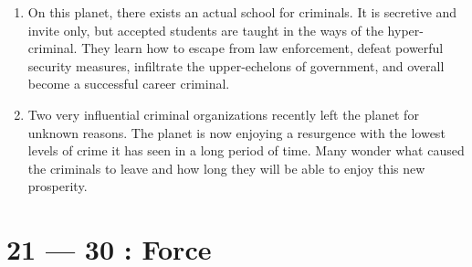 \documentclass{article}
\begin{document}
\begin{enumerate}
	\item On this planet, there exists an actual school for criminals. It is secretive and invite only, but accepted students are taught in the ways of the hyper-criminal. They learn how to escape from law enforcement, defeat powerful security measures, infiltrate the upper-echelons of government, and overall become a successful career criminal.
	\item Two very influential criminal organizations recently left the planet for unknown reasons. The planet is now enjoying a resurgence with the lowest levels of crime it has seen in a long period of time. Many wonder what caused the criminals to leave and how long they will be able to enjoy this new prosperity.\end{enumerate}
\section*{21 --- 30 : Force}
\end{document}
